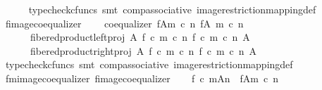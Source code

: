 \begin{isabellebody}
\ \ \ \ \isamarkupfalse%
\ {\isacharparenleft}{\kern0pt}typecheck{\isacharunderscore}{\kern0pt}cfuncs{\isacharcomma}{\kern0pt}\ smt\ comp{\isacharunderscore}{\kern0pt}associative{}\ image{\isacharunderscore}{\kern0pt}restriction{\isacharunderscore}{\kern0pt}mapping{\isacharunderscore}{\kern0pt}def{}{\isacharparenright}{\kern0pt}\isanewline
\isanewline
\ \ \isamarkupfalse%
\ f{\isacharunderscore}{\kern0pt}image{\isacharunderscore}{\kern0pt}coequalizer{\isacharcolon}{\kern0pt}\isanewline
\ \ \ \ {\isachardoublequoteopen}coequalizer\ {\isacharparenleft}{\kern0pt}f{\isasymlparr}A{\isasymrparr}\isactrlbsub m\ {\isasymcirc}\isactrlsub c\ n\isactrlesub {\isacharparenright}{\kern0pt}\ {\isacharparenleft}{\kern0pt}f{\isasymrestriction}\isactrlbsub {\isacharparenleft}{\kern0pt}A{\isacharcomma}{\kern0pt}\ m\ {\isasymcirc}\isactrlsub c\ n{\isacharparenright}{\kern0pt}\isactrlesub {\isacharparenright}{\kern0pt}\ \isanewline
\ \ \ \ \ \ {\isacharparenleft}{\kern0pt}fibered{\isacharunderscore}{\kern0pt}product{\isacharunderscore}{\kern0pt}left{\isacharunderscore}{\kern0pt}proj\ A\ {\isacharparenleft}{\kern0pt}f\ {\isasymcirc}\isactrlsub c\ m\ {\isasymcirc}\isactrlsub c\ n{\isacharparenright}{\kern0pt}\ {\isacharparenleft}{\kern0pt}f\ {\isasymcirc}\isactrlsub c\ m\ {\isasymcirc}\isactrlsub c\ n{\isacharparenright}{\kern0pt}\ A{\isacharparenright}{\kern0pt}\ \isanewline
\ \ \ \ \ \ {\isacharparenleft}{\kern0pt}fibered{\isacharunderscore}{\kern0pt}product{\isacharunderscore}{\kern0pt}right{\isacharunderscore}{\kern0pt}proj\ A\ {\isacharparenleft}{\kern0pt}f\ {\isasymcirc}\isactrlsub c\ m\ {\isasymcirc}\isactrlsub c\ n{\isacharparenright}{\kern0pt}\ {\isacharparenleft}{\kern0pt}f\ {\isasymcirc}\isactrlsub c\ m\ {\isasymcirc}\isactrlsub c\ n{\isacharparenright}{\kern0pt}\ A{\isacharparenright}{\kern0pt}{\isachardoublequoteclose}\isanewline
\ \ \ \ \isamarkupfalse%
\ {\isacharparenleft}{\kern0pt}typecheck{\isacharunderscore}{\kern0pt}cfuncs{\isacharcomma}{\kern0pt}\ smt\ comp{\isacharunderscore}{\kern0pt}associative{}\ image{\isacharunderscore}{\kern0pt}restriction{\isacharunderscore}{\kern0pt}mapping{\isacharunderscore}{\kern0pt}def{}{\isacharparenright}{\kern0pt}\isanewline
\isanewline
\ \ \isamarkupfalse%
\ f{\isacharunderscore}{\kern0pt}m{\isacharunderscore}{\kern0pt}image{\isacharunderscore}{\kern0pt}coequalizer\ f{\isacharunderscore}{\kern0pt}image{\isacharunderscore}{\kern0pt}coequalizer\isanewline
\ \ \isamarkupfalse%
\ {\isachardoublequoteopen}{\isacharparenleft}{\kern0pt}f\ {\isasymcirc}\isactrlsub c\ m{\isacharparenright}{\kern0pt}{\isasymlparr}A{\isasymrparr}\isactrlbsub n\isactrlesub \ {\isasymcong}\ f{\isasymlparr}A{\isasymrparr}\isactrlbsub m\ {\isasymcirc}\isactrlsub c\ n\isactrlesub {\isachardoublequoteclose}\isanewline

\end{isabellebody}
